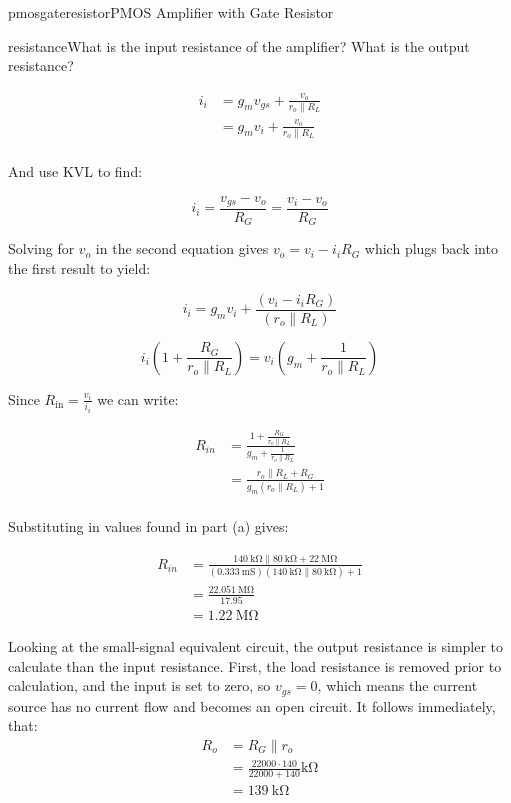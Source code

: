 \begin{mainquestion}{pmosgateresistor}{PMOS Amplifier with Gate Resistor}
\begin{partquestion}{resistance}{What is the input resistance of the amplifier? What is the output resistance?}
\begin{answer}
\begin{align*}
    i_i &= g_m v_{gs} + \frac{v_o}{r_o \parallel R_L} \\
    &= g_m v_i + \frac{v_o}{r_o \parallel R_L} \\ 
\end{align*}

And use KVL to find:

\[
i_{i} = \frac{v_{gs} - v_{o}}{R_{G}} = \frac{v_{i} - v_{o}}{R_{G}}
\]

Solving for $v_{o}$ in the second equation gives $v_{o} = v_{i} - i_{i}R_{G}$ which plugs back into the first result to yield:

\[
i_{i} = g_{m}v_{i} + \frac{(v_{i} - i_{i}R_{G})}{(r_{o} \parallel R_{L})}
\]

\[
i_{i}\left(1 + \frac{R_{G}}{r_{o} \parallel R_{L}}\right) = v_{i}\left(g_{m} + \frac{1}{r_{o} \parallel R_{L}}\right)
\]

Since $R_{\text{in}} = \frac{v_{i}}{i_{i}}$ we can write:

\begin{align*}
    R_{in} &= \frac{1 + \frac{R_G}{r_o \parallel R_L}}{g_m + \frac{1}{r_o \parallel R_L}} \\
    &= \frac{r_o \parallel R_L + R_G}{g_m (r_o \parallel R_L) + 1} \\
\end{align*}

Substituting in values found in part (a) gives:

\begin{align*}
    R_{in} &= \frac{\qty{140}{\kilo\ohm} \parallel \qty{80}{\kilo\ohm} + \qty{22}{\mega\ohm}}{(\qty{0.333}{\milli\siemens}) (\qty{140}{\kilo\ohm} \parallel \qty{80}{\kilo\ohm}) + 1} \\
    &= \frac{\qty{22.051}{\mega\ohm}}{17.95} \\
    &= \qty{1.22}{\mega\ohm}
\end{align*}

Looking at the small-signal equivalent circuit, the output resistance is simpler to calculate than the input resistance. First, the load resistance is removed prior to calculation, and the input is set to zero, so $v_{gs} = 0$, which means the current source has no current flow and becomes an open circuit. It follows immediately, that:
\begin{align*}
    R_o &= R_G \parallel r_o \\
    &= \frac{22000 \cdot 140}{22000 + 140} \unit{\kilo\ohm} \\
    &= \qty{139}{\kilo\ohm}
\end{align*}
\end{answer}
\end{partquestion}


\end{mainquestion}
